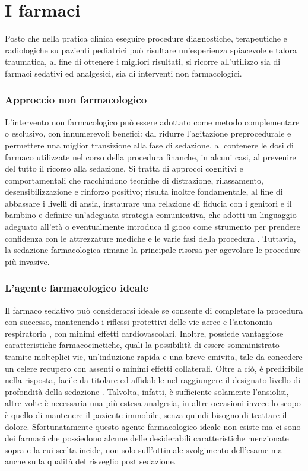\chapter{I farmaci}

Posto che nella pratica clinica eseguire procedure diagnostiche, terapeutiche e radiologiche su pazienti pediatrici può risultare un'esperienza spiacevole e talora traumatica, al fine di ottenere i migliori risultati, si ricorre all'utilizzo sia di farmaci sedativi ed analgesici, sia di interventi non farmacologici. 

\subsection*{Approccio non farmacologico}

L'intervento non farmacologico può essere adottato come metodo complementare o esclusivo, con innumerevoli benefici: dal ridurre l'agitazione preprocedurale e permettere una miglior transizione alla fase di sedazione, al contenere le dosi di farmaco utilizzate nel corso della procedura finanche, in alcuni casi, al prevenire del tutto il ricorso alla sedazione. Si tratta di approcci cognitivi e comportamentali che racchiudono tecniche di distrazione, rilassamento, desensibilizzazione e rinforzo positivo; risulta inoltre fondamentale, al fine di abbassare i livelli di ansia, instaurare una relazione di fiducia con i genitori e il bambino e definire un'adeguata strategia comunicativa, che adotti un linguaggio adeguato all'età o eventualmente introduca il gioco come strumento per prendere confidenza con le attrezzature mediche e le varie fasi della procedura \cite{Uptodate}. Tuttavia, la sedazione farmacologica rimane la principale risorsa per agevolare le procedure più invasive. 

\subsection*{L'agente farmacologico ideale}

Il farmaco sedativo può considerarsi ideale se consente di completare la procedura con successo, mantenendo i riflessi protettivi delle vie aeree e l'autonomia respiratoria \cite{Krauss2006}, con minimi effetti cardiovascolari. Inoltre, possiede vantaggiose caratteristiche farmacocinetiche, quali la possibilità di essere somministrato tramite  molteplici vie, un'induzione rapida e una breve emivita, tale da concedere un celere recupero con assenti o minimi effetti collaterali. Oltre a ciò, è predicibile nella risposta, facile da titolare ed affidabile nel raggiungere il designato livello di profondità della sedazione \cite{Mahmoud2015}. Talvolta, infatti, è sufficiente solamente l'ansiolisi, altre volte è necessaria una più estesa analgesia, in altre occasioni invece lo scopo è quello di mantenere il paziente immobile, senza quindi bisogno di trattare il dolore. 
Sfortunatamente questo agente farmacologico ideale non esiste ma ci sono dei farmaci che possiedono alcune delle desiderabili caratteristiche menzionate sopra e la cui scelta incide, non solo sull'ottimale svolgimento dell'esame ma anche sulla qualità del risveglio post sedazione. 

